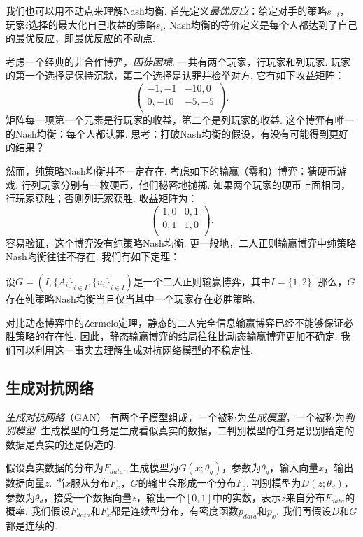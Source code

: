 我们也可以用不动点来理解Nash均衡. 首先定义\emph{最优反应}：给定对手的策略$s_{-i}$，玩家$i$选择的最大化自己收益的策略$s_i$. Nash均衡的等价定义是每个人都达到了自己的最优反应，即最优反应的不动点.


\begin{example}[囚徒困境]
考虑一个经典的非合作博弈，\emph{囚徒困境}. 一共有两个玩家，行玩家和列玩家. 玩家的第一个选择是保持沉默，第二个选择是认罪并检举对方. 它有如下收益矩阵：
\[
\begin{pmatrix}
-1,-1&-10,0\\
0,-10&-5,-5\\
\end{pmatrix}.
\]
矩阵每一项第一个元素是行玩家的收益，第二个是列玩家的收益. 这个博弈有唯一的Nash均衡：每个人都认罪. 思考：打破Nash均衡的假设，有没有可能得到更好的结果？
\end{example}

然而，纯策略Nash均衡并不一定存在. 考虑如下的输赢（零和）博弈：猜硬币游戏. 行列玩家分别有一枚硬币，他们秘密地抛掷. 如果两个玩家的硬币上面相同，行玩家获胜；否则列玩家获胜. 收益矩阵为：
    \[
    \begin{pmatrix}
    1,0&0,1\\
    0,1&1,0\\
    \end{pmatrix}.
    \]
容易验证，这个博弈没有纯策略Nash均衡. 更一般地，二人正则输赢博弈中纯策略Nash均衡往往不存在. 我们有如下定理：
\begin{theorem}
设$G=(I,\{A_i\}_{i\in I}, \{u_i\}_{i\in I})$是一个二人正则输赢博弈，其中$I=\{1,2\}$. 那么，$G$存在纯策略Nash均衡当且仅当其中一个玩家存在必胜策略. %
\end{theorem}
对比动态博弈中的Zermelo定理，静态的二人完全信息输赢博弈已经不能够保证必胜策略的存在性. 因此，静态输赢博弈的结局往往比动态输赢博弈更加不确定. 我们可以利用这一事实去理解生成对抗网络模型的不稳定性.


\subsection{生成对抗网络}

\emph{生成对抗网络}（GAN） 有两个子模型组成，一个被称为\emph{生成模型}，一个被称为\emph{判别模型}. 生成模型的任务是生成看似真实的数据，二判别模型的任务是识别给定的数据是真实的还是伪造的.

假设真实数据的分布为$F_{data}$. 生成模型为$G(x;\theta_g)$，参数为$\theta_g$，输入向量$x$，输出数据向量$z$. 当$x$服从分布$F_x$，$G$的输出会形成一个分布$F_g$. 判别模型为$D(z;\theta_d)$，参数为$\theta_d$，接受一个数据向量$z$，输出一个$[0,1]$中的实数，表示$z$来自分布$F_{data}$的概率. 我们假设$F_{data}$和$F_x$都是连续型分布，有密度函数$p_{data}$和$p_x$. 我们再假设$D$和$G$都是连续的.

